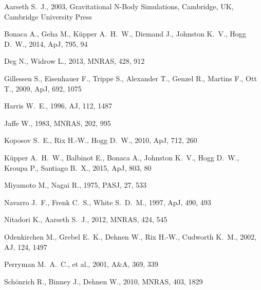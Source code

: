 Aarseth S.~J., 2003, Gravitational N-Body Simulations, Cambridge, UK, Cambridge University Press 

Bonaca A., Geha M., K{\"u}pper A.~H.~W., Diemand J., Johnston K.~V., Hogg D.~W., 2014, ApJ, 795, 94 

Deg N., Widrow L., 2013, MNRAS, 428, 912 

Gillessen S., Eisenhauer F., Trippe S., Alexander T., Genzel R., Martins F., Ott T., 2009, ApJ, 692, 1075 

Harris W.~E., 1996, AJ, 112, 1487 

Jaffe W., 1983, MNRAS, 202, 995 

Koposov S.~E., Rix H.-W., Hogg D.~W., 2010, ApJ, 712, 260 

K{\"u}pper A.~H.~W., Balbinot E., Bonaca A., Johnston K.~V., Hogg D.~W., Kroupa P., Santiago B.~X., 2015, ApJ, 803, 80 

Miyamoto M., Nagai R., 1975, PASJ, 27, 533 

Navarro J.~F., Frenk C.~S., White S.~D.~M., 1997, ApJ, 490, 493 

Nitadori K., Aarseth S.~J., 2012, MNRAS, 424, 545 

Odenkirchen M., Grebel E.~K., Dehnen W., Rix H.-W., Cudworth K.~M., 2002, AJ, 124, 1497 

Perryman M.~A.~C., et al., 2001, A\&A, 369, 339 

Sch{\"o}nrich R., Binney J., Dehnen W., 2010, MNRAS, 403, 1829 

